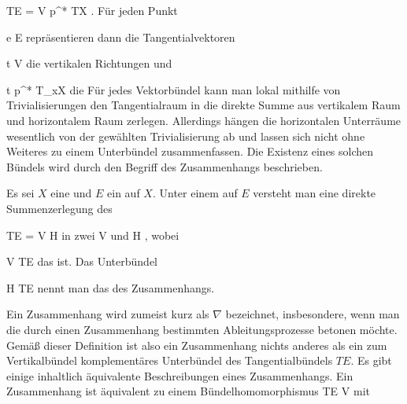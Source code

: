 \mavergleichskette
{\vergleichskette
{ TE
}
{ = }{ V \oplus p^* TX
}
{  }{
}
{    }{
}
{   }{
}
}
{}{}{.}
Für jeden Punkt

\mavergleichskette
{\vergleichskette
{ e
}
{ \in }{ E
}
{  }{
}
{    }{
}
{   }{
}
}
{}{}{}
repräsentieren dann die Tangentialvektoren

\mavergleichskette
{\vergleichskette
{ t
}
{ \in }{ V
}
{  }{
}
{    }{
}
{   }{
}
}
{}{}{}
die vertikalen Richtungen und

\mavergleichskette
{\vergleichskette
{ t
}
{ \in }{ p^* T_xX
}
{  }{
}
{    }{
}
{   }{
}
}
{}{}{}
die  Für jedes Vektorbündel kann man lokal mithilfe von Trivialisierungen den Tangentialraum
 in die direkte Summe aus vertikalem Raum und horizontalem Raum zerlegen. Allerdings hängen die horizontalen Unterräume wesentlich von der gewählten Trivialisierung ab und lassen sich nicht ohne Weiteres
 {} {}
zu einem Unterbündel zusammenfassen. Die Existenz eines solchen Bündels wird durch den Begriff des Zusammenhangs beschrieben.

{}
{

Es sei $X$ eine
und $E$ ein
auf $X$. Unter einem
auf $E$ versteht man eine direkte Summenzerlegung des

\mavergleichskette
{\vergleichskette
{ TE
}
{ = }{ V \oplus H
}
{  }{
}
{    }{
}
{   }{
}
}
{}{}{}
in zwei
\mathkor {} {V} {und} {H} {,}
wobei

\mavergleichskette
{\vergleichskette
{ V
}
{ \subseteq }{ TE
}
{  }{
}
{    }{
}
{   }{
}
}
{}{}{}
das
ist. Das Unterbündel

\mavergleichskette
{\vergleichskette
{ H
}
{ \subseteq }{ TE
}
{  }{
}
{    }{
}
{   }{
}
}
{}{}{}
nennt man das
des Zusammenhangs.

}

Ein Zusammenhang wird zumeist kurz als $\nabla$ bezeichnet, insbesondere, wenn man die durch einen Zusammenhang bestimmten Ableitungsprozesse betonen möchte. Gemäß dieser Definition ist also ein Zusammenhang nichts anderes als ein zum Vertikalbündel komplementäres Unterbündel des Tangentialbündels $TE$. Es gibt einige inhaltlich äquivalente Beschreibungen eines Zusammenhangs. Ein Zusammenhang ist äquivalent zu einem Bündelhomomorphismus
 {} {}
 {TE} {V
} {}
mit


